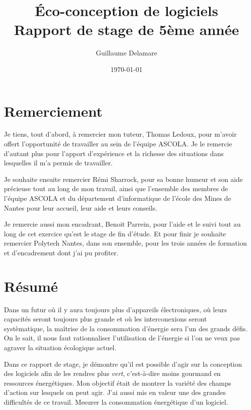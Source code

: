 \documentclass[a4paper, 11pt]{report}
\title{Éco-conception de logiciels\\ \large Rapport de stage de 5ème année}
\author{Guillaume Delamare}
\date{\today}
\begin{document}
\renewcommand{\labelitemi}{$\bullet$}
\renewcommand{\labelitemii}{$\diamond$}
\renewcommand{\labelitemiii}{$\ast$}
\renewcommand{\labelitemiv}{$\cdot$}

\maketitle

\section*{Remerciement}
Je tiens, tout d'abord, à remercier mon tuteur, Thomas Ledoux, pour m'avoir offert l'opportunité de travailler au sein de l'équipe ASCOLA. Je le remercie d'autant plus pour l'apport d'expérience et la richesse des situations dans lesquelles il m'a permis de travailler.

Je souhaite ensuite remercier Rémi Sharrock, pour sa bonne humeur et son aide précieuse tout au long de mon travail, ainsi que l'ensemble des membres de l'équipe ASCOLA et du département d'informatique de l'école des Mines de Nantes pour leur accueil, leur aide et leurs conseils.

Je remercie aussi mon encadrant, Benoit Parrein, pour l'aide et le suivi tout au long de cet exercice qu'est le stage de fin d'étude. Et pour finir je souhaite remercier Polytech Nantes, dans son ensemble, pour les trois années de formation et d'encadrement dont j'ai pu profiter.

\newpage

\section*{Résumé}
Dans un futur où il y aura toujours plus d'appareils électroniques, où leurs capacités seront toujours plus grande et où les interconexions seront systèmatique, la maîtrise de la consommation d'énergie sera l'un des grands défis. On le sait, il nous faut rationnaliser l'utilisation de l'énergie si l'on ne veux pas agraver la situation écologique actuel.

Dans ce rapport de stage, je démontre qu'il est possible d'agir sur la conception des logiciels afin de les rendres plus \textit{vert}, c'est-à-dire moins gourmand en ressources énergétiques. Mon objectif était de montrer la variété des champs d'action sur lesquels on peut agir. J'ai aussi mis en valeur une des grandes difficultés de ce travail. Mesurer la consommation énergétique d'un logiciel.
\end{document}

